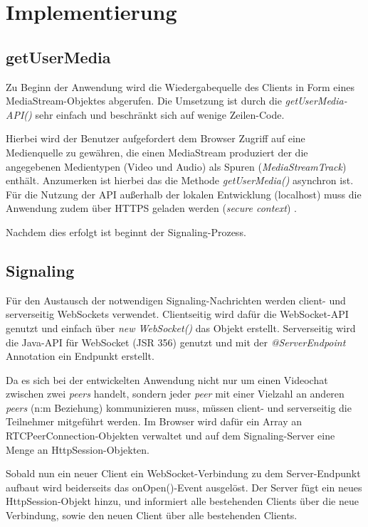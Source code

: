 

\section{Implementierung}
\label{sec:implementierung}

\subsection{getUserMedia}
\label{subsec:getUserMedia}
Zu Beginn der Anwendung wird die Wiedergabequelle des Clients in Form eines MediaStream-Objektes abgerufen.
Die Umsetzung ist durch die \textit{getUserMedia-API()} sehr einfach und beschränkt sich auf wenige Zeilen-Code.

Hierbei wird der Benutzer aufgefordert dem Browser Zugriff auf eine Medienquelle zu gewähren, die einen MediaStream produziert der die angegebenen
Medientypen (Video und Audio) als Spuren (\textit{MediaStreamTrack}) enthält.
Anzumerken ist hierbei das die Methode \textit{getUserMedia()} asynchron ist.
Für die Nutzung der API außerhalb der lokalen Entwicklung (localhost) muss die Anwendung zudem über
HTTPS geladen werden (\textit{secure context}) \parencite{MozUserMediaSecurity}.

Nachdem dies erfolgt ist beginnt der Signaling-Prozess.

\subsection{Signaling}
\label{subsec:Signaling}
Für den Austausch der notwendigen Signaling-Nachrichten werden client- und serverseitig WebSockets verwendet.
Clientseitig wird dafür die WebSocket-API genutzt und einfach über \textit{new WebSocket()} das Objekt erstellt.
Serverseitig wird die Java-API für WebSocket (JSR 356) genutzt und mit der \textit{@ServerEndpoint} Annotation ein Endpunkt erstellt.

Da es sich bei der entwickelten Anwendung nicht nur um einen Videochat zwischen zwei \textit{peers} handelt, sondern jeder \textit{peer}
mit einer Vielzahl an anderen \textit{peers} (n:m Beziehung) kommunizieren muss, müssen client- und serverseitig die Teilnehmer mitgeführt werden.
Im Browser wird dafür ein Array an RTCPeerConnection-Objekten verwaltet und auf dem Signaling-Server eine Menge an HttpSession-Objekten.

Sobald nun ein neuer Client ein WebSocket-Verbindung zu dem Server-Endpunkt aufbaut wird beiderseits das onOpen()-Event ausgelöst.
Der Server fügt ein neues HttpSession-Objekt hinzu, und informiert alle bestehenden Clients über die neue Verbindung, sowie den neuen Client
über alle bestehenden Clients.

